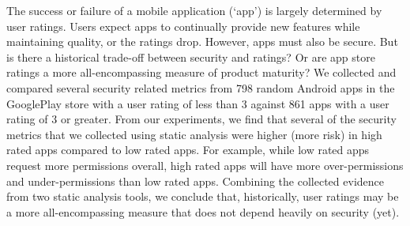 The success or failure of a mobile application (`app') is largely determined by user ratings. Users expect apps to continually provide new features while maintaining quality, or the ratings drop. However, apps must also be secure. But is there a historical trade-off between security and ratings? Or are app store ratings a more all-encompassing measure of product maturity? We collected and compared several security related metrics from 798 random Android apps in the GooglePlay store with a user rating of less than 3 against 861 apps with a user rating of 3 or greater. From our experiments, we find that several of the security metrics that we collected using static analysis were higher (more risk) in high rated apps compared to low rated apps. For example, while low rated apps request more permissions overall, high rated apps will have more over-permissions and under-permissions than low rated apps. Combining the collected evidence from two static analysis tools, we conclude that, historically, user ratings may be a more all-encompassing measure that does not depend heavily on security (yet). 

